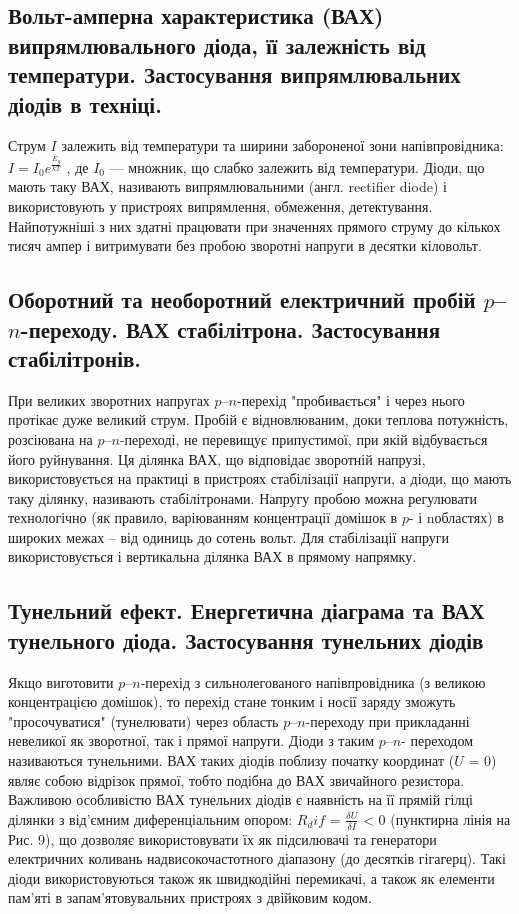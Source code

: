 \subsection{Вольт-амперна характеристика (ВАХ) випрямлювального діода, її залежність від температури. Застосування випрямлювальних діодів в техніці.}
\qquad
Струм $I$ залежить від температури та ширини забороненої зони
напівпровідника:$I = I_0 e^{\frac{E_g}{kT}} $ , де $I_0$ — множник, що слабко залежить від
температури. Діоди, що мають таку ВАХ, називають випрямлювальними
(англ. rectifier diode) і використовують у пристроях випрямлення,
обмеження, детектування. Найпотужніші з них здатні працювати при
значеннях прямого струму до кількох тисяч ампер і витримувати без
пробою зворотні напруги в десятки кіловольт.
\subsection{Оборотний та необоротний електричний пробій $p$–$n$-переходу. ВАХ
стабілітрона. Застосування стабілітронів. }
При великих зворотних напругах $p$–$n$-перехід "пробивається" і через
нього протікає дуже великий струм. Пробій є відновлюваним, доки
теплова потужність, розсіювана на $p$–$n$-переході, не перевищує
припустимої, при якій відбувається його руйнування. Ця ділянка ВАХ, що
відповідає зворотній напрузі, використовується на практиці в пристроях
стабілізації напруги, а діоди, що мають таку ділянку, називають
стабілітронами. Напругу пробою можна регулювати
технологічно (як правило, варіюванням концентрації домішок в $p$- і nобластях) в широких межах – від одиниць до сотень вольт. Для
стабілізації напруги використовується і вертикальна ділянка ВАХ в
прямому напрямку.
\subsection{Тунельний ефект. Енергетична діаграма та ВАХ тунельного діода.
Застосування тунельних діодів}
Якщо виготовити $p$–$n$-перехід з сильнолегованого напівпровідника (з
великою концентрацією домішок), то перехід стане тонким і носії заряду
зможуть "просочуватися" (тунелювати) через область $p$–$n$-переходу при
прикладанні невеликої як зворотної, так і прямої напруги. Діоди з таким
$p$–$n$- переходом називаються тунельними. ВАХ таких
діодів поблизу початку координат ($U$ = 0) являє собою відрізок прямої,
тобто подібна до ВАХ звичайного резистора. Важливою особливістю
ВАХ тунельних діодів є наявність на її прямій гілці ділянки з від’ємним
диференціальним опором: $R_dif$ = $\frac{\delta U}{\delta I}$ < 0 (пунктирна лінія на Рис. 9), що
дозволяє використовувати їх як підсилювачі та генератори електричних
коливань надвисокочастотного діапазону (до десятків гігагерц). Такі діоди
використовуються також як швидкодійні перемикачі, а також як елементи
пам’яті в запам’ятовувальних пристроях з двійковим кодом.
